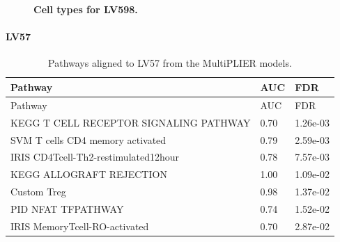 \documentclass[
  a4paper,
]{article}
\newenvironment{fignos:tagged-figure}[1][]{
  \let\oldfigurename\figurename
  \renewcommand{\figurename}{Supplementary Figure}
}{
  \let\figurename\oldfigurename
}
\newenvironment{tablenos:tagged-table}[1][]{
  \let\oldtablename\tablename
  \renewcommand{\tablename}{Supplementary Table}
}{
  \let\tablename\oldtablename
}
\begin{document}
\begin{fignos:tagged-figure}[S20]

\begin{figure}
\hypertarget{fig:sup:lv598}{%
\centering

\caption{\textbf{Cell types for LV598.}
}\label{fig:sup:lv598}
}
\end{figure}

\end{fignos:tagged-figure}

\clearpage

\hypertarget{lv57}{%
\paragraph{LV57}\label{lv57}}

\begin{tablenos:tagged-table}[S24]

\begin{longtable}[]{@{}lll@{}}
\caption{Pathways aligned to LV57 from the MultiPLIER models.
\label{tbl:sup:multiplier_pathways:lv57}}\label{tbl:sup:multiplier_pathways:lv57}\tabularnewline
\toprule()
Pathway & AUC & FDR \\
\midrule()
\endfirsthead
\toprule()
Pathway & AUC & FDR \\
\midrule()
\endhead
KEGG T CELL RECEPTOR SIGNALING PATHWAY & 0.70 & 1.26e-03 \\
SVM T cells CD4 memory activated & 0.79 & 2.59e-03 \\
IRIS CD4Tcell-Th2-restimulated12hour & 0.78 & 7.57e-03 \\
KEGG ALLOGRAFT REJECTION & 1.00 & 1.09e-02 \\
Custom Treg & 0.98 & 1.37e-02 \\
PID NFAT TFPATHWAY & 0.74 & 1.52e-02 \\
IRIS MemoryTcell-RO-activated & 0.70 & 2.87e-02 \\
\bottomrule()
\end{longtable}

\end{tablenos:tagged-table}
\end{document}
